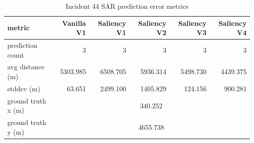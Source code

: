 \begin{table}[ht]
\centering
\caption{Incident 44 SAR prediction error metrics}
\label{tab:sar-incident-44}
\begin{tabular}{lrrrrr}
\hline
metric & Vanilla V1 & Saliency V1 & Saliency V2 & Saliency V3 & Saliency V4 \\
\hline
prediction count & 3 & 3 & 3 & 3 & 3 \\
avg distance (m) & 5303.985 & 6508.705 & 5936.314 & 5498.730 & 4439.375 \\
stddev (m) & 63.651 & 2499.100 & 1405.829 & 124.156 & 900.281 \\
ground truth x (m) & \multicolumn{5}{c}{340.252} \\
ground truth y (m) & \multicolumn{5}{c}{4655.738} \\
\hline
\end{tabular}
\end{table}
